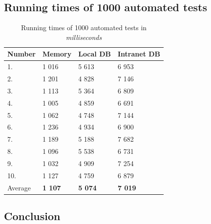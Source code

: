 \documentclass[
  print,
  table,
  nolof,
  nolot,
  nocover,
  oneside
]{fithesis3}
\begin{document}
\subsection{Running times of 1000 automated tests}
\begin{table}[H]
  \begin{tabularx}{\textwidth}{XXXX}
    \toprule
    Number & Memory & Local DB & Intranet DB \\
    \midrule
    1.  & 1 016 & 5 613 & 6 953 \\
    2.  & 1 201 & 4 828 & 7 146 \\
    3.  & 1 113 & 5 364 & 6 809 \\
    4.  & 1 005 & 4 859 & 6 691 \\
    5.  & 1 062 & 4 748 & 7 144 \\
    6.  & 1 236 & 4 934 & 6 900 \\
    7.  & 1 189 & 5 188 & 7 682 \\ 
    8.  & 1 096 & 5 538 & 6 731 \\
    9.  & 1 032 & 4 909 & 7 254 \\
    10. & 1 127 & 4 759 & 6 879 \\
    \bottomrule
    Average & \textbf{1 107} & \textbf{5 074} & \textbf{7 019} \\
  \end{tabularx}
  \caption{Running times of 1000 automated tests in \textit{milliseconds}}
  \label{tab:1000tests}
\end{table}


\subsection{Conclusion}
\label{conclusion}
\end{document}
